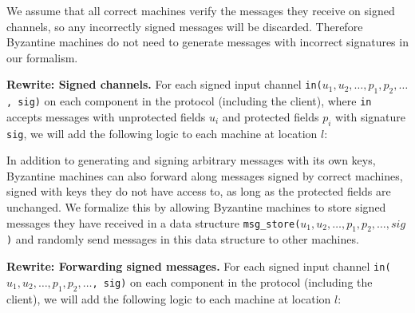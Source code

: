 We assume that all correct machines verify the messages they receive on signed channels, so any incorrectly signed messages will be discarded.
Therefore Byzantine machines do not need to generate messages with incorrect signatures in our formalism.

\textbf{Rewrite: Signed channels.} For each signed input channel \texttt{in($u_1, u_2, \ldots, p_1, p_2, \ldots$, sig)} on each component in the protocol (including the client), where \texttt{in} accepts messages with unprotected fields $u_i$ and protected fields $p_i$ with signature \texttt{sig}, we will add the following logic to each machine at location $l$:
\begin{algorithmic}
            \EndFor
        \EndFor
    \EndFor
\EndIf
\end{algorithmic}

In addition to generating and signing arbitrary messages with its own keys, Byzantine machines can also forward along messages signed by correct machines, signed with keys they do not have access to, as long as the protected fields are unchanged.
We formalize this by allowing Byzantine machines to store signed messages they have received in a data structure \texttt{msg\_store($u_1,u_2,\ldots,p_1,p_2,\ldots,sig$)} and randomly send messages in this data structure to other machines.
 

\textbf{Rewrite: Forwarding signed messages.} For each signed input channel \texttt{in($u_1, u_2, \ldots, p_1, p_2, \ldots$, sig)} on each component in the protocol (including the client), we will add the following logic to each machine at location $l$:
\begin{algorithmic}
        \EndFor
    \EndFor
\EndIf
\end{algorithmic}

